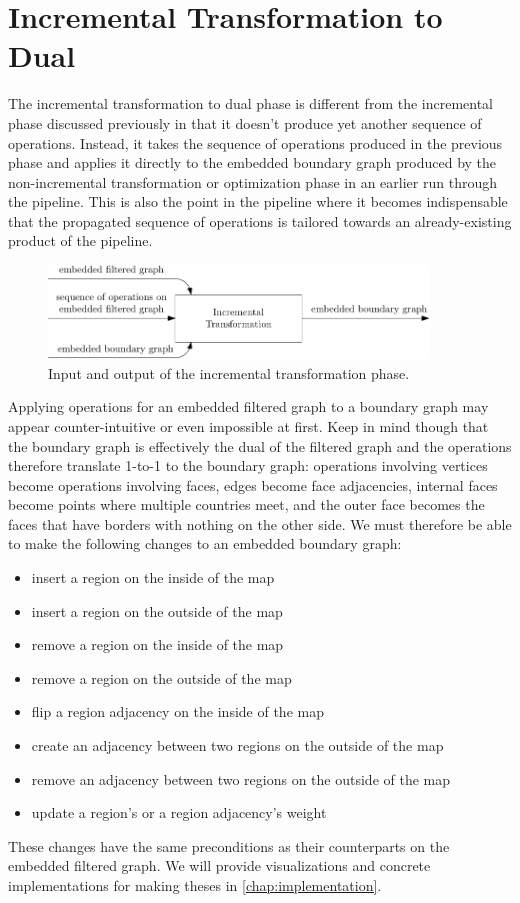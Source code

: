 \section{Incremental Transformation to Dual}
\label{sect:incremental-transformation-to-dual}

The incremental transformation to dual phase is different from the incremental phase discussed previously in that it doesn't produce yet another sequence of operations. Instead, it takes the sequence of operations produced in the previous phase and applies it directly to the embedded boundary graph produced by the non-incremental transformation or optimization phase in an earlier run through the pipeline. This is also the point in the pipeline where it becomes indispensable that the propagated sequence of operations is tailored towards an already-existing product of the pipeline.

\begin{figure}[H]
	\centering\includegraphics[width=0.9\textwidth]{Resources/DynamicPipeline-IncrementalTransformation.pdf}
	\caption{Input and output of the incremental transformation phase.}
	\label{fig:dynamic-pipeline-incremental-transformation}
\end{figure}

Applying operations for an embedded filtered graph to a boundary graph may appear counter-intuitive or even impossible at first. Keep in mind though that the boundary graph is effectively the dual of the filtered graph and the operations therefore translate 1-to-1 to the boundary graph: operations involving vertices become operations involving faces, edges become face adjacencies, internal faces become points where multiple countries meet, and the outer face becomes the faces that have borders with nothing on the other side. We must therefore be able to make the following changes to an embedded boundary graph:

\begin{itemize}
	\setlength\itemsep{-0.25em}
	\item insert a region on the inside of the map
	\item insert a region on the outside of the map
	\item remove a region on the inside of the map
	\item remove a region on the outside of the map
	\item flip a region adjacency on the inside of the map
	\item create an adjacency between two regions on the outside of the map
	\item remove an adjacency between two regions on the outside of the map
	\item update a region's or a region adjacency's weight
\end{itemize}

These changes have the same preconditions as their counterparts on the embedded filtered graph. We will provide visualizations and concrete implementations for making theses in \cref{chap:implementation}.
